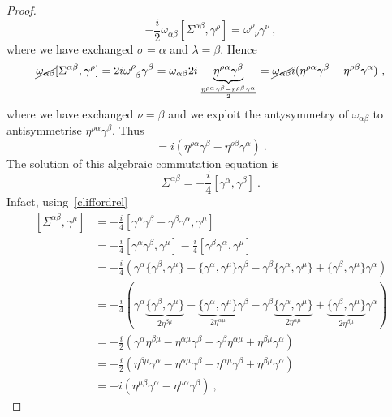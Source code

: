 \begin{proof}
\begin{equation*}
        \end{equation*}
        \begin{equation*}
            - \frac{i}{2} \omega_{\alpha\beta} [\Sigma^{\alpha\beta}, \gamma^\rho] = \omega^\rho_{\phantom \rho \nu} \gamma^\nu ~,
        \end{equation*}
        where we have exchanged $\sigma = \alpha$ and $\lambda = \beta$. Hence 
        \begin{equation*}
            \cancel{\omega_{\alpha\beta}} [\Sigma^{\alpha\beta}, \gamma^\rho] = 2 i \omega^\rho_{\phantom \rho \beta} \gamma^\beta = \omega_{\alpha\beta} 2i \underbrace{\eta^{\rho\alpha} \gamma^{\beta}}_{\frac{\eta^{\rho\alpha} \gamma^{\beta} - \eta^{\rho\beta} \gamma^{\alpha}}{2}} = \cancel{\omega_{\alpha\beta}} i ( \eta^{\rho\alpha} \gamma^{\beta} - \eta^{\rho\beta} \gamma^{\alpha}) ~,
        \end{equation*}
        where we have exchanged $\nu = \beta$ and we exploit the antysymmetry of $\omega_{\alpha\beta}$ to antisymmetrise $\eta^{\rho\alpha}\gamma^{\beta}$. Thus 
        \begin{equation*}
            [\Sigma^{\alpha\beta}, \gamma^\rho] = i (\eta^{\rho\alpha} \gamma^{\beta} - \eta^{\rho\beta} \gamma^{\alpha}) ~.
        \end{equation*}
        The solution of this algebraic commutation equation is 
        \begin{equation*}
            \Sigma^{\alpha\beta} = - \frac{i}{4} [\gamma^\alpha, \gamma^\beta] ~.
        \end{equation*}
        Infact, using~\eqref{cliffordrel}
        \begin{equation*}
        \begin{aligned}
            [\Sigma^{\alpha\beta}, \gamma^\mu] & = - \frac{i}{4} [\gamma^\alpha \gamma^\beta - \gamma^\beta \gamma^\alpha, \gamma^\mu] \\ & = - \frac{i}{4} [\gamma^\alpha \gamma^\beta, \gamma^\mu] - \frac{i}{4} [\gamma^\beta \gamma^\alpha, \gamma^\mu] \\ & = - \frac{i}{4} (\gamma^\alpha \{\gamma^\beta, \gamma^\mu\} - \{\gamma^\alpha, \gamma^\mu \} \gamma^\beta - \gamma^\beta \{\gamma^\alpha, \gamma^\mu\} + \{\gamma^\beta, \gamma^\mu \} \gamma^\alpha ) \\ & = - \frac{i}{4} (\gamma^\alpha \underbrace{\{\gamma^\beta, \gamma^\mu\}}_{2 \eta^{\beta\mu}} - \underbrace{\{\gamma^\alpha, \gamma^\mu \}}_{2 \eta^{\alpha\mu}} \gamma^\beta - \gamma^\beta \underbrace{\{\gamma^\alpha, \gamma^\mu\}}_{2\eta^{\alpha\mu}} + \underbrace{\{\gamma^\beta, \gamma^\mu \}}_{2 \eta^{\beta \mu}} \gamma^\alpha ) \\ & = - \frac{i}{2} (\gamma^\alpha \eta^{\beta\mu} - \eta^{\alpha\mu}\gamma^\beta - \gamma^\beta \eta^{\alpha\mu} + \eta^{\beta \mu} \gamma^\alpha ) \\ & = - \frac{i}{2} (\eta^{\beta\mu} \gamma^\alpha  - \eta^{\alpha\mu} \gamma^\beta - \eta^{\alpha\mu} \gamma^\beta + \eta^{\beta \mu} \gamma^\alpha ) \\ & = - i (\eta^{\mu\beta} \gamma^\alpha  - \eta^{\mu\alpha} \gamma^\beta) ~,

\end{aligned}
\end{equation*}
\end{proof}
